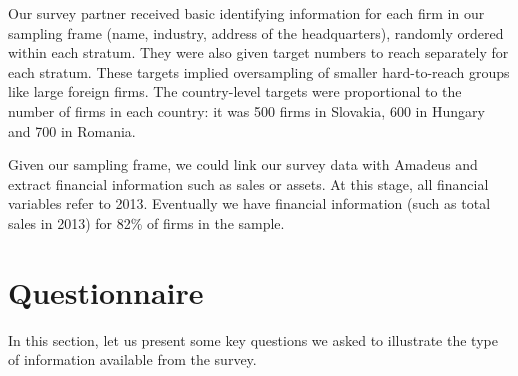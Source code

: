 \documentclass[final, dvipsnames, authoryear,12pt]{elsarticle}
\begin{document}
Our survey partner received basic identifying information for each firm in our sampling frame (name, industry, address of the headquarters), randomly ordered within each stratum. They were also given target numbers to reach separately for each stratum. These targets implied oversampling of smaller hard-to-reach groups like large foreign firms. The country-level targets were proportional to the number of firms in each country:  it was 500 firms in Slovakia, 600 in Hungary and 700 in Romania.



Given our sampling frame, we could link our survey data with Amadeus and extract financial information such as sales or assets. At this stage, all financial variables refer to 2013. Eventually we have financial information (such as total sales in 2013) for 82\% of firms in the sample. 






\section{Questionnaire}
\label{sec:question}


In this section, let us present some key questions we asked to illustrate the type of information available from the survey.  
\end{document}
